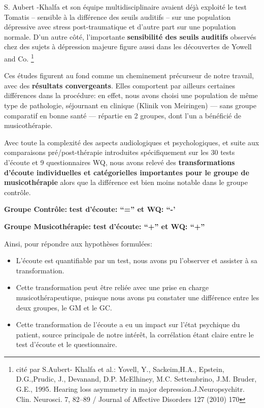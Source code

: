   S. Aubert -Khalfa et son équipe multidisciplinaire \autocite{affectiveDisorders} avaient déjà
  exploité le test Tomatis -- sensible à la différence des
  seuils auditifs -- sur une population
  dépressive avec stress post-traumatique et d'autre part sur une population normale.
  D'un autre côté, l'importante\textbf{ sensibilité des seuils auditifs }observés chez des
  sujets à dépression majeure figure aussi dans les découvertes de Yowell and Co.
  \autocite{affectiveDisorders}\footnote{cité
  par S.Aubert- Khalfa et al.: Yovell, Y.,
    Sackeim,H.A., Epstein, D.G.,Prudic, J., Devanand, D.P. McElhiney,
    M.C. Settembrino, J.M. Bruder, G.E., 1995. Hearing loss asymmetry in
    major depression.J.Neuropsychitr. Clin. Neurosci. 7, 82--89 / Journal of Affective Disorders 127
    (2010) 170}

  Ces études figurent au fond comme un cheminement précurseur de notre
  travail, avec des \textbf{résultats convergeants}. Elles comportent par ailleurs certaines différences dans la
   procédure:  %
   en effet, nous avons choisi
   une population de même type de pathologie, séjournant en clinique (Klinik von Meiringen) --- sans
   groupe comparatif en bonne santé --- répartie en 2 groupes,
  dont l'un a bénéficié de
  musicothérapie.



  Avec toute la
  complexité des aspects audiologiques et psychologiques,
  et suite aux comparaisons
  pré/post-thérapie introduites spécifiquement sur les 30 tests d'écoute et 9 questionnaires WQ, nous
  avons relevé des \textbf{transformations d'écoute
   individuelles et
  catégorielles importantes pour le groupe de musicothérapie} alors que
  la différence est bien moins notable dans le groupe contrôle.



  \textbf{Groupe Contrôle:} 	          \textbf{ test d'écoute: ``=''   et    WQ: ``-'}


  \textbf{Groupe Musicothérapie:}     \textbf{test d'écoute: ``+''      et    WQ: ``+''}



  Ainsi, pour répondre aux hypothèses formulées:
  \begin{itemize}
       \item
          L'écoute est quantifiable  par un test, nous avons pu l'observer et   assister à sa
  transformation.

  \item Cette transformation peut être reliée  avec
  une prise en charge musicothérapeutique, puisque nous avons pu constater une différence entre les deux groupes, le GM et le GC.

  \item Cette transformation de l'écoute a eu  un impact sur l'état
  psychique du patient, source principale de notre intérêt, la corrélation étant claire entre le test d'écoute et le questionnaire.
  \end{itemize}

